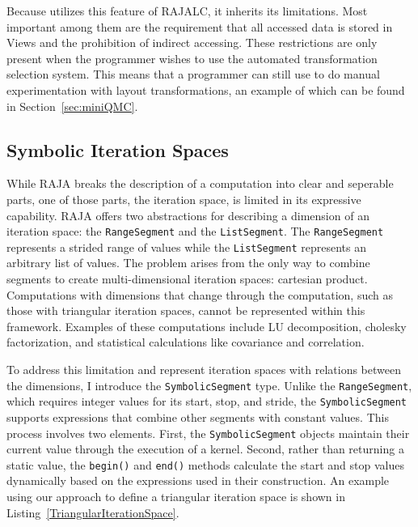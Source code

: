 Because \FormatDecisions{} utilizes this feature of RAJALC, it inherits its limitations.
Most important among them are the requirement that all accessed data is stored in Views and the prohibition of indirect accessing.
These restrictions are only present when the programmer wishes to use the automated transformation selection system. 
This means that a programmer can still use \FormatDecisions{} to do manual experimentation with layout transformations, an example of which can be found in Section~\ref{sec:miniQMC}.

\subsection{Symbolic Iteration Spaces}
\label{sec:SymbolicSegment}
While RAJA breaks the description of a computation into clear and seperable parts, one of those parts, the iteration space, is limited in its expressive capability.
RAJA offers two abstractions for describing a dimension of an iteration space: the \verb.RangeSegment. and the \verb.ListSegment..
The \verb.RangeSegment. represents a strided range of values while the \verb.ListSegment. represents an arbitrary list of values.
The problem arises from the only way to combine segments to create multi-dimensional iteration spaces: cartesian product.
Computations with dimensions that change through the computation, such as those with triangular iteration spaces, cannot be represented within this framework.
Examples of these computations include LU decomposition, cholesky factorization, and statistical calculations like covariance and correlation.


To address this limitation and represent iteration spaces with relations between the dimensions, I introduce the \verb.SymbolicSegment. type. 
Unlike the \verb.RangeSegment., which requires integer values for its start, stop, and stride, the \verb.SymbolicSegment. supports expressions that combine other segments with constant values. 
This process involves two elements.
First, the \verb.SymbolicSegment. objects maintain their current value through the execution of a kernel. 
Second, rather than returning a static value, the \verb.begin(). and \verb.end(). methods calculate the start and stop values dynamically based on the expressions used in their construction. 
An example using our approach to define a triangular iteration space is shown in Listing~\ref{TriangularIterationSpace}.

